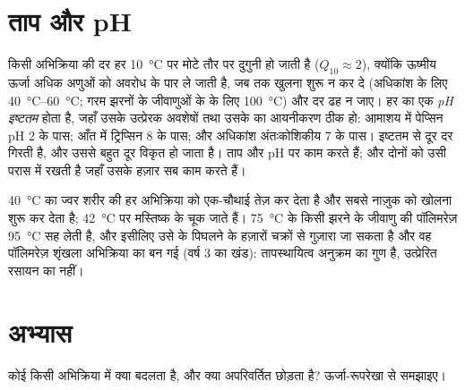 \section{ताप और pH}

\begin{proposition}[एंजाइम और उनका परिवेश]\label{prop:b1:enzymes:environment}
किसी  अभिक्रिया की दर हर \qty{10}{\celsius} पर मोटे तौर पर
दुगुनी हो जाती है ($Q_{10} \approx 2$), क्योंकि ऊष्मीय ऊर्जा अधिक अणुओं
को अवरोध के पार ले जाती है, जब तक  खुलना शुरू न कर दे
(अधिकांश के लिए \qtyrange{40}{60}{\celsius}; गरम झरनों के जीवाणुओं के
 के लिए \qty{100}{\celsius}) और दर ढह न जाए। हर  का एक
\emph{pH इष्टतम} होता है, जहाँ उसके उत्प्रेरक अवशेषों तथा उसके 
का आयनीकरण ठीक हो: आमाशय में पेप्सिन pH 2 के पास;
आँत में ट्रिप्सिन 8 के पास; और अधिकांश अंतःकोशिकीय  7 के पास।
इष्टतम से दूर दर गिरती है, और उससे बहुत दूर  विकृत हो जाता है।
ताप और pH  पर काम करते हैं; और  दोनों को उसी परास में रखती
है जहाँ उसके हज़ार  सब काम करते हैं।
\end{proposition}

\begin{example}\label{ex:b1:enzymes:fever}
\qty{40}{\celsius} का ज्वर शरीर की हर अभिक्रिया को एक-चौथाई तेज़ कर देता
है और सबसे नाज़ुक  को खोलना शुरू कर देता है;
\qty{42}{\celsius} पर मस्तिष्क के  चूक जाते हैं। \qty{75}{\celsius}
के किसी झरने के जीवाणु की  पॉलिमरेज़ \qty{95}{\celsius} सह लेती है,
और इसीलिए उसे  के पिघलने के हज़ारों चक्रों से गुज़ारा जा सकता है
और वह पॉलिमरेज़ शृंखला अभिक्रिया का  बन गई (वर्ष 3 का
खंड): तापस्थायित्व अनुक्रम का गुण है, उत्प्रेरित रसायन का नहीं।
\end{example}

\section{अभ्यास}

\begin{exercise}[$\star$]\label{exo:b1:enzymes:1}
कोई  किसी अभिक्रिया में क्या बदलता है, और क्या अपरिवर्तित छोड़ता
है? ऊर्जा-रूपरेखा से समझाइए।
\end{exercise}

